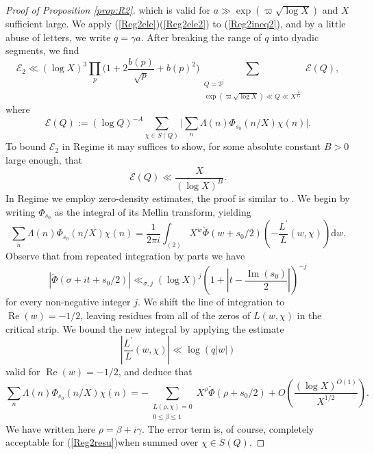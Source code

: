 \documentclass[12pt,reqno]{amsart}
\numberwithin{equation}{section}
\theoremstyle{plain}
\theoremstyle{definition}
\theoremstyle{remark}
\newcommand{\dd}{\mathrm{d}}
\begin{document}
\begin{proof}[Proof of Proposition \ref{prop:R2}]
which is valid for $a \gg \exp (\varpi \sqrt{\log X})$ and $X$ sufficient large. We apply (\ref{Reg2ele})(\ref{Reg2ele2}) to (\ref{Reg2ineq2}), and by a little abuse of letters, we write $q=\gamma a$. After breaking the range of $q$ into dyadic segments, we find
\begin{equation*}\label{EpsilonQ}
 \mathcal{E}_2\ll
 (\log X)^3 \prod_{p} \Big(1+2\frac{b(p)}{\sqrt{p}}+b(p)^2\Big)
 \sum_{\substack{Q=2^j \\ \exp(\varpi \sqrt{\log X}) \ll Q \ll X^{\frac{2}{15}}}} \mathcal{E}(Q),
\end{equation*}
where
\begin{equation*}
\mathcal{E}(Q):={(\log Q)}^{-A} \sum_{\chi \in S(Q)}\Big|\sum_n \Lambda(n) \Phi_{s_0}(n / X) \chi(n)\Big|.
\end{equation*}
To bound $\mathcal{E}_2$ in Regime \uppercase\expandafter{}  it may suffices to show, for some absolute constant $B>0$ large enough, that
\begin{equation}\label{Reg2resu}
\mathcal{E}(Q)\ll \frac{X}{(\log X)^B}.
\end{equation}
In Regime \uppercase\expandafter{} we employ zero-density estimates, the proof is similar to \cite[Section 6.4]{BP22}. We begin by writing $\Phi_{s_0}$ as the integral of its Mellin transform, yielding
\begin{equation*}
\sum_n \Lambda(n) \Phi_{s_0}(n / X) \chi(n)=\frac{1}{2 \pi i} \int_{(2)} X^w \check{\Phi}\left(w+s_0 / 2\right)\left(-\frac{L^{\prime}}{L}(w, \chi)\right) \dd w.
\end{equation*}
Observe that from repeated integration by parts we have
\begin{equation}\label{rapdeca}
\left|\check{\Phi}\left(\sigma+i t+s_0 / 2\right)\right| \ll_{\sigma, j}(\log X)^j\left(1+\left|t-\frac{\operatorname{Im}\left(s_0\right)}{2}\right|\right)^{-j}
\end{equation}
for every non-negative integer $j$.
We shift the line of integration to $\operatorname{Re}(w)=-1 / 2$, leaving residues from all of the zeros of $L(w, \chi)$ in the critical strip. We bound the new integral by applying the estimate
\begin{equation*}
\left|\frac{L^{\prime}}{L}(w, \chi)\right| \ll \log (q|w|)
\end{equation*}
valid for $\operatorname{Re}(w)=-1 / 2$, and deduce that
\begin{equation*}
\sum_n \Lambda(n) \Phi_{s_0}(n / X) \chi(n)=-\sum_{\substack{L(\rho, \chi)=0 \\ 0 \leq \beta \leq 1}} X^\rho \check{\Phi}\left(\rho+s_0 / 2\right)+O\left(\frac{(\log X)^{O(1)}}{X^{1 / 2}}\right) .
\end{equation*}
We have written here $\rho=\beta+i \gamma$. The error term is, of course, completely acceptable for (\ref{Reg2resu})when summed over $\chi \in S(Q)$.


\end{proof}
\end{document}
